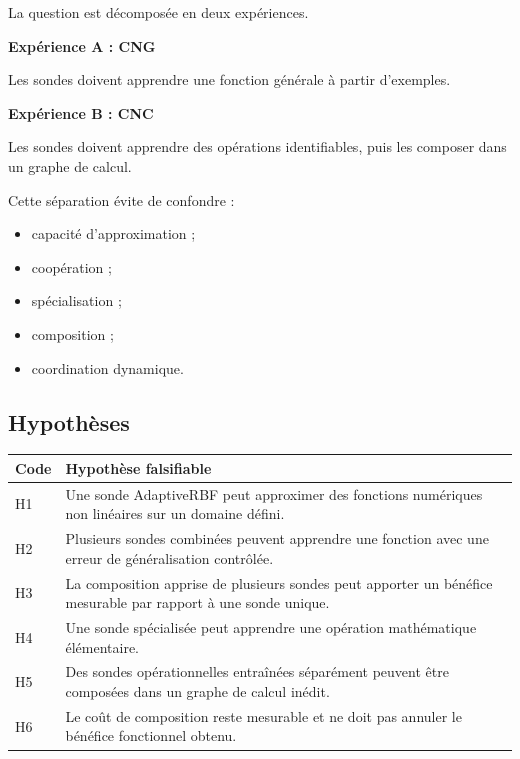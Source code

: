 \documentclass[11pt,a4paper]{article}
\begin{document}
La question est décomposée en deux expériences.

\textbf{Expérience A : CNG}

Les sondes doivent apprendre une fonction générale
à partir d'exemples.

\textbf{Expérience B : CNC}

Les sondes doivent apprendre des opérations identifiables,
puis les composer dans un graphe de calcul.

Cette séparation évite de confondre :
\begin{itemize}
    \item capacité d'approximation ;
    \item coopération ;
    \item spécialisation ;
    \item composition ;
    \item coordination dynamique.
\end{itemize}

\subsection{Hypothèses}

\begin{tabularx}{\textwidth}{
    >{\centering\arraybackslash}p{}
    X
}
\toprule
\textbf{Code} & \textbf{Hypothèse falsifiable} \\
\midrule
H1
& Une sonde AdaptiveRBF peut approximer des fonctions
numériques non linéaires sur un domaine défini. \\

H2
& Plusieurs sondes combinées peuvent apprendre
une fonction avec une erreur de généralisation contrôlée. \\

H3
& La composition apprise de plusieurs sondes peut
apporter un bénéfice mesurable par rapport à une sonde unique. \\

H4
& Une sonde spécialisée peut apprendre une opération
mathématique élémentaire. \\

H5
& Des sondes opérationnelles entraînées séparément
peuvent être composées dans un graphe de calcul inédit. \\

H6
& Le coût de composition reste mesurable et ne doit pas
annuler le bénéfice fonctionnel obtenu. \\
\bottomrule
\end{tabularx}
\end{document}

